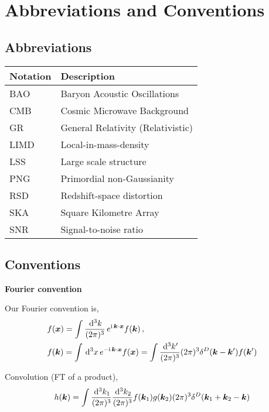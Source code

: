 \chapter*{Abbreviations and Conventions}
\label{chapter:conventions}
\section*{}
\singlespacing

\section*{Abbreviations}
\setlength{\tabcolsep}{14pt}
\begin{center}
\begin{tabular}{l | l}
	\textbf{Notation} & \textbf{Description} \\
	\hline
	BAO & Baryon Acoustic Oscillations \\
	CMB & Cosmic Microwave Background \\
	GR & General Relativity (Relativistic) \\
	LIMD & Local-in-mass-density \\
	LSS & Large scale structure \\
	PNG & Primordial non-Gaussianity \\
	RSD & Redshift-space distortion \\
	SKA & Square Kilometre Array \\
	SNR & Signal-to-noise ratio 
\end{tabular}
\end{center}
\section*{Conventions}

\textbf{Fourier convention}


Our Fourier convention is, 
\begin{align*}
	&f(\bm {x}) = \int \frac{\,\mathrm{d}^3 k}{(2\pi)^3}\, e^{\mathrm{i\,} \bm {k} \cdot \bm {x}} f(\bm {k})\,,\\
	&f(\bm {k}) = \int \,\mathrm{d}^3x\, e^{- \mathrm{i\,} \bm {k}\cdot\bm {x}} f(\bm {x}) = \int \frac{\,\mathrm{d}^3 k'}{(2\pi)^3} (2\pi)^3 \delta^D(\bm {k}-\bm {k}') f(\bm {k}')
\end{align*}

Convolution (FT of a product), 
\begin{equation*}
	h(\bm {k}) = \int \frac{\,\mathrm{d}^3k_1}{(2\pi)^3} \frac{\,\mathrm{d}^3k_2}{(2\pi)^3} f(\bm {k}_1) g(\bm {k}_2) (2\pi)^3 \delta^D(\bm {k}_1 +\bm {k}_2 - \bm {k})
\end{equation*}





